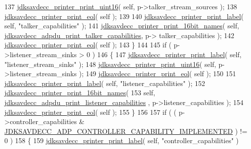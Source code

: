 \begin{DoxyCode}
137             \hyperlink{group__util_ga9793e0ff8e7ed25d957282ee6b257ce2}{jdksavdecc\_printer\_print\_uint16}( \textcolor{keyword}{self}, p->talker\_stream\_sources 
      );
138             \hyperlink{group__util_gacda56c9d3d24593a52c999682fa6e6e3}{jdksavdecc\_printer\_print\_eol}( \textcolor{keyword}{self} );
139 
140             \hyperlink{group__util_gaf7818b24143b3c7502926a425a242ff5}{jdksavdecc\_printer\_print\_label}( \textcolor{keyword}{self}, \textcolor{stringliteral}{"talker\_capabilities"} );
141             \hyperlink{group__util_gab2b52d5747dd94956e7c008203606eae}{jdksavdecc\_printer\_print\_16bit\_names}( \textcolor{keyword}{self}, 
      \hyperlink{group__adp__print_ga0aef8e9a7f6f1f06031a411798f7718e}{jdksavdecc\_adpdu\_print\_talker\_capabilities}, p->
      talker\_capabilities );
142             \hyperlink{group__util_gacda56c9d3d24593a52c999682fa6e6e3}{jdksavdecc\_printer\_print\_eol}( \textcolor{keyword}{self} );
143         \}
144 
145         \textcolor{keywordflow}{if} ( p->listener\_stream\_sinks > 0 )
146         \{
147             \hyperlink{group__util_gaf7818b24143b3c7502926a425a242ff5}{jdksavdecc\_printer\_print\_label}( \textcolor{keyword}{self}, \textcolor{stringliteral}{"listener\_stream\_sinks"} );
148             \hyperlink{group__util_ga9793e0ff8e7ed25d957282ee6b257ce2}{jdksavdecc\_printer\_print\_uint16}( \textcolor{keyword}{self}, p->listener\_stream\_sinks 
      );
149             \hyperlink{group__util_gacda56c9d3d24593a52c999682fa6e6e3}{jdksavdecc\_printer\_print\_eol}( \textcolor{keyword}{self} );
150 
151             \hyperlink{group__util_gaf7818b24143b3c7502926a425a242ff5}{jdksavdecc\_printer\_print\_label}( \textcolor{keyword}{self}, \textcolor{stringliteral}{"listener\_capabilities"} );
152             \hyperlink{group__util_gab2b52d5747dd94956e7c008203606eae}{jdksavdecc\_printer\_print\_16bit\_names}(
153                 \textcolor{keyword}{self}, \hyperlink{group__adp__print_ga351e524043eb2b40b15283777be6ad5a}{jdksavdecc\_adpdu\_print\_listener\_capabilities}
      , p->listener\_capabilities );
154             \hyperlink{group__util_gacda56c9d3d24593a52c999682fa6e6e3}{jdksavdecc\_printer\_print\_eol}( \textcolor{keyword}{self} );
155         \}
156 
157         \textcolor{keywordflow}{if} ( ( p->controller\_capabilities & 
      \hyperlink{group__adp__controller__capability_ga1dfc12e568b168ad6c0f6cdecca7b39e}{JDKSAVDECC\_ADP\_CONTROLLER\_CAPABILITY\_IMPLEMENTED} ) != 0 )
158         \{
159             \hyperlink{group__util_gaf7818b24143b3c7502926a425a242ff5}{jdksavdecc\_printer\_print\_label}( \textcolor{keyword}{self}, \textcolor{stringliteral}{"controller\_capabilities"} )

\end{DoxyCode}
